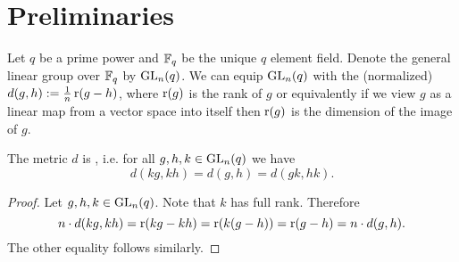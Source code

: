 








\section{Preliminaries}\label{sec:generalDefns}
Let $q$ be a prime power and $\mathbb{F}_q$ be the unique $q$ element field. Denote the general linear group over $\mathbb{F}_q$ by $\operatorname{GL}_n(q)$. We can equip $\operatorname{GL}_n(q)$ with the (normalized)  $d(g,h):=\frac{1}{n}\operatorname{r}(g-h)$, where $\operatorname{r}(g)$ is the rank of $g$ or equivalently if we view $g$ as a linear map from a vector space into itself then $\operatorname{r}(g)$ is the dimension of the image of $g$. 

\begin{lemma}
The metric $d$ is , i.e. for all $g,h,k\in \operatorname{GL}_n(q)$ we have 
\[d(kg,kh)=d(g,h)=d(gk,hk).\] 
\end{lemma}
\begin{proof}
Let $g,h,k\in \operatorname{GL}_n(q)$. Note that $k$ has full rank. Therefore
\[n\cdot d(kg,kh)=\operatorname{r}(kg-kh)=\operatorname{r}(k(g-h))=\operatorname{r}(g-h)=n\cdot d(g,h).\]
The other equality follows similarly.
\end{proof}


